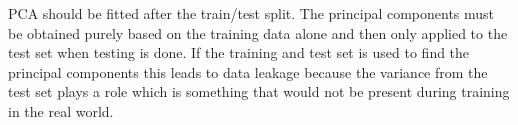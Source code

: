  PCA should be fitted after the train/test split. The principal components must be obtained
purely based on the training data alone and then only applied to the test set when testing is
done. If the training and test set is used to find the principal components this leads to 
data leakage because the variance from the test set plays a role which is something that would
not be present during training in the real world.